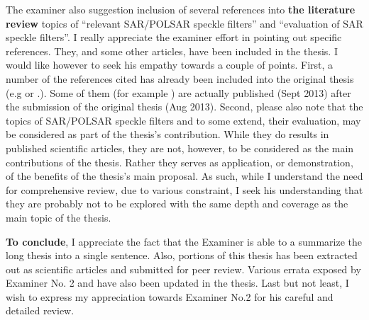 The examiner also suggestion inclusion of several references into \textbf{the literature review} topics of ``relevant SAR/POLSAR speckle filters'' and  ``evaluation of SAR speckle filters''.
I really appreciate the examiner effort in pointing out specific references.
They, and some other articles, have been included in the thesis.
I would like however to seek his empathy towards a couple of points.
First, a number of the references cited has already been included into the original thesis (e.g \cite{Touzi_2002_TGRS} or \cite{Xie_2002_TGRS}.). 
Some of them (for example \cite{Argenti_GRSM_2013}) are actually published (Sept 2013) after the submission of the original thesis (Aug 2013).
Second, please also note that the topics of SAR/POLSAR speckle filters and to some extend, their evaluation, may be considered as part of the thesis's contribution.
While they do results in published scientific articles, 
  they are not, however, to be considered as the main contributions of the thesis.
Rather they serves as application, or demonstration, of the benefits of the thesis's main proposal.
As such, while I understand the need for comprehensive review, due to various constraint, I seek his understanding that they are probably not to be explored with the same depth and coverage as the main topic of the thesis.

\textbf{To conclude}, I appreciate the fact that the Examiner is able to a summarize the long thesis into a single sentence.
Also, portions of this thesis has been extracted out as scientific articles and submitted for peer review.
Various errata exposed by Examiner No. 2 and have also been updated in the thesis.
Last but not least, I wish to express my appreciation towards Examiner No.2 for his careful and detailed review.

%



